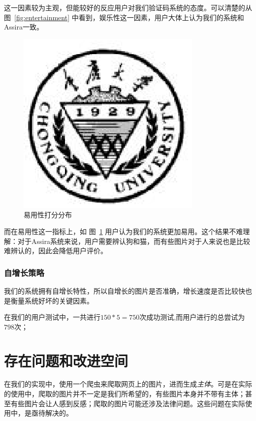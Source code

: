 \documentclass[bachelor,zhspacing]{cqu}  %
\begin{document}
这一因素较为主观，但能较好的反应用户对我们验证码系统的态度。可以清楚的从
图~\ref{fig:entertainment}
中看到，娱乐性这一因素，用户大体上认为我们的系统和Assira一致。

\begin{figure}[htbp]
\centering
\includegraphics{pic/cqu.eps}
\caption{易用性打分分布}\label{fig:easy-used}
\end{figure}

而在易用性这一指标上，如 图~\ref{fig:easy-used}
用户认为我们的系统更加易用。这个结果不难理解：对于Assira系统来说，用户需要辨认狗和猫，而有些图片对于人来说也是比较难辨认的，因此会降低用户评价。

\subsubsection{自增长策略}\label{ux81eaux589eux957fux7b56ux7565-1}

我们的系统拥有自增长特性，所以自增长的图片是否准确，增长速度是否比较快也是衡量系统好坏的关键因素。

在我们的用户测试中，一共进行\(150*5=750\)次成功测试,而用户进行的总尝试为\(798\)次；

\section{存在问题和改进空间}\label{ux5b58ux5728ux95eeux9898ux548cux6539ux8fdbux7a7aux95f4}

在我们的实现中，使用一个爬虫来爬取网页上的图片，进而生成\emph{主体}。可是在实际的使用中，爬取的图片并不一定是我们所希望的，有些图片本身并不带有主体；甚至有些图片会让人感到反感；爬取的图片可能还涉及法律问题。这些问题在实际使用中，是亟待解决的。
\end{document}
